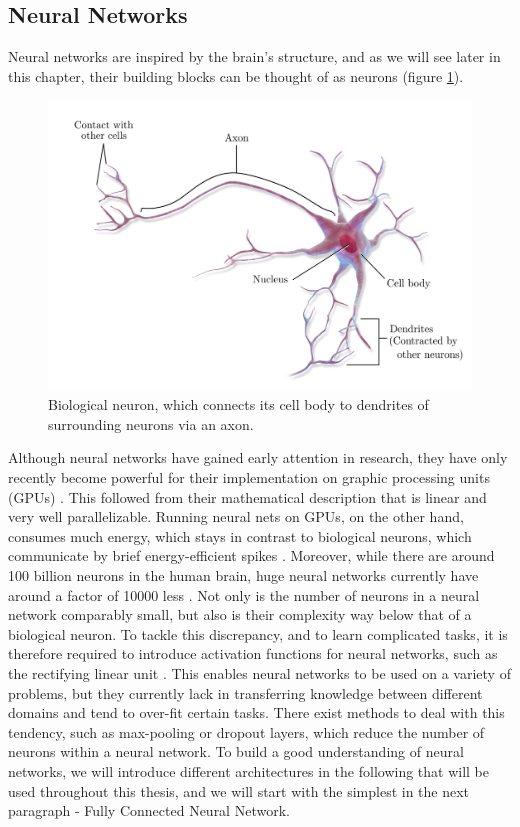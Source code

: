 \FloatBarrier
\subsection{Neural Networks}
\label{sec::221_nn}
Neural networks are inspired by the brain's structure, and as we will see later in this chapter, their building blocks can be thought of as neurons (figure \ref{fig::221_neuron}).
\begin{figure}[h!]
	\centering
	\includegraphics[scale=.35]{chapters/02_background/img/neuron.png}
	\caption{Biological neuron, which connects its cell body to dendrites of surrounding neurons via an axon. \cite{haggstrom2014medical}}
	\label{fig::221_neuron}
\end{figure}
Although neural networks have gained early attention in research, they have only recently become powerful for their implementation on graphic processing units (GPUs) \cite{oh2004gpu}. This followed from their mathematical description that is linear and very well parallelizable. Running neural nets on GPUs, on the other hand, consumes much energy, which stays in contrast to biological neurons, which communicate by brief energy-efficient spikes \cite{hodgkin1952quantitative}. Moreover, while there are around 100 billion neurons in the human brain, huge neural networks currently have around a factor of 10000 less \cite{goodfellow2016deep}. Not only is the number of neurons in a neural network comparably small, but also is their complexity way below that of a biological neuron. To tackle this discrepancy, and to learn complicated tasks, it is therefore required to introduce activation functions for neural networks, such as the rectifying linear unit \cite{krizhevsky2012imagenet}. This enables neural networks to be used on a variety of problems, but they currently lack in transferring knowledge between different domains and tend to over-fit certain tasks. There exist methods to deal with this tendency, such as max-pooling \cite{weng1992cresceptron} or dropout \cite{srivastava2014dropout} layers, which reduce the number of neurons within a neural network. To build a good understanding of neural networks, we will introduce different architectures in the following that will be used throughout this thesis, and we will start with the simplest in the next paragraph - Fully Connected Neural Network.
\FloatBarrier
